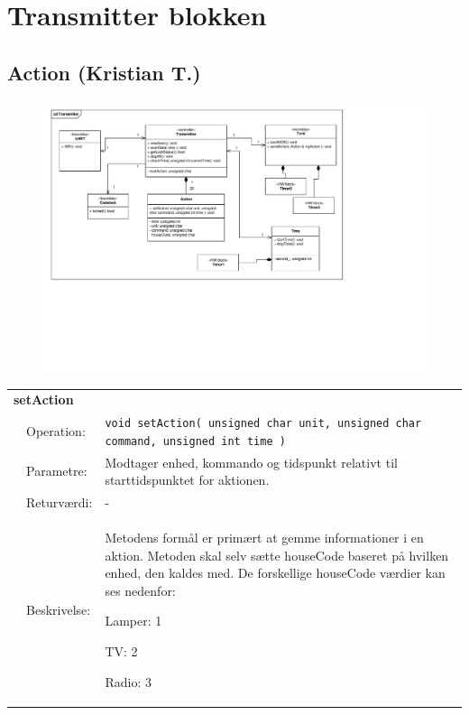 \section{Transmitter blokken}

\subsection{Action (Kristian T.)}

\begin{figure}[h]
\centering
\includegraphics[scale=1,clip=true, trim=210 288 442.4 203]{Systemarkitektur/diagrammer/Transmitter_Klassediagram} %
\end{figure}

\begin{table}[h]
\begin{tabularx}{\textwidth}{p{0.6 cm} l X} %
\multicolumn{3}{l}{\textbf{setAction}}\\
& Operation: & %
\texttt{void setAction( unsigned char unit, unsigned char command, unsigned int time ) }
\\ & Parametre: & %
Modtager enhed, kommando og tidspunkt relativt til starttidspunktet for aktionen.
\\ & Returværdi: & %
-
\\ & Beskrivelse: & %
Metodens formål er primært at gemme informationer i en aktion. Metoden skal selv sætte houseCode baseret på hvilken enhed, den kaldes med. De forskellige houseCode værdier kan ses nedenfor:

Lamper: 1

TV: 2

Radio: 3
\\ \end{tabularx}
\end{table}



